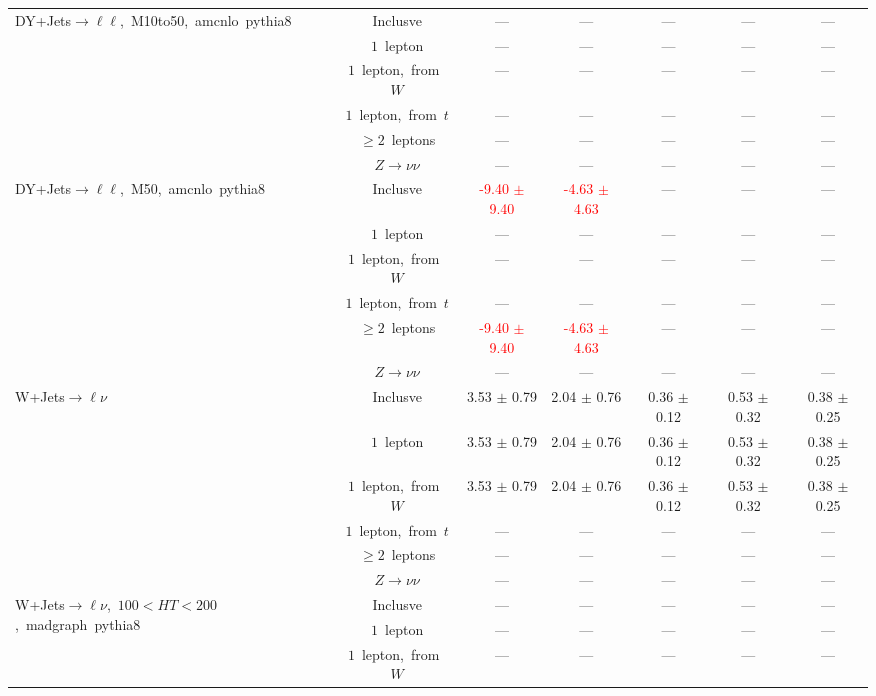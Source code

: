\documentclass{article}
\begin{document}
\begin{longtable}{|l|c|c|c|c|c|c|}
\hline 
\multirow{6}{*}{DY+Jets$\rightarrow\ell\ell$,~M10to50,~amcnlo~pythia8} & Inclusve  & ---  & ---  & ---  & ---  & --- \\* 
 & $1$~lepton  & ---  & ---  & ---  & ---  & --- \\* 
 & $1$~lepton,~from~$W$  & ---  & ---  & ---  & ---  & --- \\* 
 & $1$~lepton,~from~$t$  & ---  & ---  & ---  & ---  & --- \\* 
 & $\ge2$~leptons  & ---  & ---  & ---  & ---  & --- \\* 
 & $Z\rightarrow\nu\nu$  & ---  & ---  & ---  & ---  & --- \\* 
\hline 
\multirow{6}{*}{DY+Jets$\rightarrow\ell\ell$,~M50,~amcnlo~pythia8} & Inclusve  & \textcolor{red}{ -9.40 $\pm$ 9.40 }  & \textcolor{red}{ -4.63 $\pm$ 4.63 }  & ---  & ---  & --- \\* 
 & $1$~lepton  & ---  & ---  & ---  & ---  & --- \\* 
 & $1$~lepton,~from~$W$  & ---  & ---  & ---  & ---  & --- \\* 
 & $1$~lepton,~from~$t$  & ---  & ---  & ---  & ---  & --- \\* 
 & $\ge2$~leptons  & \textcolor{red}{ -9.40 $\pm$ 9.40 }  & \textcolor{red}{ -4.63 $\pm$ 4.63 }  & ---  & ---  & --- \\* 
 & $Z\rightarrow\nu\nu$  & ---  & ---  & ---  & ---  & --- \\* 
\hline 
\multirow{6}{*}{W+Jets$\rightarrow\ell\nu$} & Inclusve  & 3.53 $\pm$ 0.79  & 2.04 $\pm$ 0.76  & 0.36 $\pm$ 0.12  & 0.53 $\pm$ 0.32  & 0.38 $\pm$ 0.25 \\* 
 & $1$~lepton  & 3.53 $\pm$ 0.79  & 2.04 $\pm$ 0.76  & 0.36 $\pm$ 0.12  & 0.53 $\pm$ 0.32  & 0.38 $\pm$ 0.25 \\* 
 & $1$~lepton,~from~$W$  & 3.53 $\pm$ 0.79  & 2.04 $\pm$ 0.76  & 0.36 $\pm$ 0.12  & 0.53 $\pm$ 0.32  & 0.38 $\pm$ 0.25 \\* 
 & $1$~lepton,~from~$t$  & ---  & ---  & ---  & ---  & --- \\* 
 & $\ge2$~leptons  & ---  & ---  & ---  & ---  & --- \\* 
 & $Z\rightarrow\nu\nu$  & ---  & ---  & ---  & ---  & --- \\* 
\hline 
\multirow{6}{*}{W+Jets$\rightarrow\ell\nu$,~$100<HT<200$,~madgraph~pythia8} & Inclusve  & ---  & ---  & ---  & ---  & --- \\* 
 & $1$~lepton  & ---  & ---  & ---  & ---  & --- \\* 
 & $1$~lepton,~from~$W$  & ---  & ---  & ---  & ---  & --- \\* 

\end{longtable}
\end{document}
